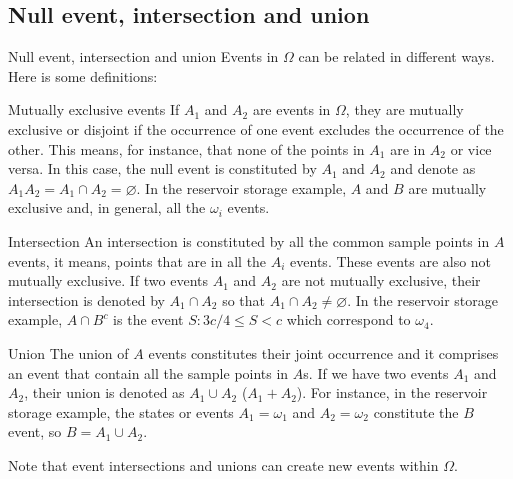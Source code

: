 \documentclass[8pt]{beamer}
\renewcommand{\emph}[1]{\textcolor{myorange}{#1}}
\begin{document}
\subsection{Null event, intersection and union}
\begin{frame}{Null event, intersection and union}
    Events in $\Omega$ can be related in different ways. Here is some definitions:
    \begin{block}{Mutually exclusive events}
        If $A_1$ and $A_2$ are events in $\Omega$, they are \emph{mutually exclusive} or \emph{disjoint} if the occurrence of one event excludes the occurrence of the other. This means, for instance, that none of the points in $A_1$ are in $A_2$ or vice versa. In this case, the \emph{null} event is constituted by $A_1$ and $A_2$ and denote as $A_1 A_2 = A_1 \cap A_2 = \varnothing$. In the reservoir storage example, $A$ and $B$ are mutually exclusive and, in general, all the $\omega_i$ events.  
    \end{block}

    \begin{block}{Intersection}
        An \emph{intersection} is constituted by all the common sample points in $A$ events, it means, points that are in all the $A_i$ events. These events are also not mutually exclusive. If two events $A_1$ and $A_2$ are not mutually exclusive, their intersection is denoted by $A_1 \cap A_2$ so that $A_1 \cap A_2 \neq \varnothing$. In the reservoir storage example, $A \cap B^c$ is the event ${S: 3c/4 \leq S < c}$ which correspond to $\omega_4$. 
    \end{block}

    \begin{block}{Union}
        The union of $A$ events constitutes their joint occurrence and it comprises an event that contain all the sample points in $A$s. If we have two events $A_1$ and $A_2$, their union is denoted as $A_1 \cup A_2$ ($A_1 + A_2$). For instance, in the reservoir storage example, the states or events $A_1 = \omega_1$ and $A_2 = \omega_2$ constitute the $B$ event, so $B = A_1 \cup A_2$.
    \end{block}
    Note that event intersections and unions can create new events within $\Omega$. 
\end{frame}
\end{document}
